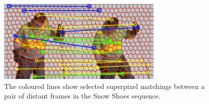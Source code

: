    \begin{figure}[thpb]
      \centering
      \includegraphics[width=0.7\textwidth]{../images/matches_snowshoes2.png}
      \caption{The coloured lines show selected superpixel
		matchings between a pair of distant frames in the Snow Shoes sequence.}
      \label{figurelabel_matchessnow}
   \end{figure}   
	\setlength{\belowcaptionskip}{-10pt}